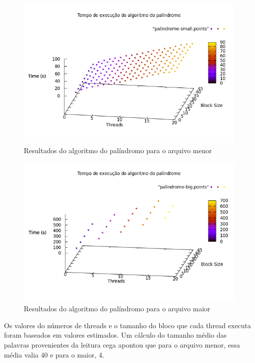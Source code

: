 \documentclass[a4paper]{article}
\begin{document}
\begin{figure}[float=p]
	\includegraphics[scale=0.5]{graph-palindrome-small}
	\caption{Resultados do algoritmo do palíndromo para o arquivo menor}
	\label{graph-palindrome-small}
\end{figure}
\begin{figure}[float=p]
	\includegraphics[scale=0.5]{graph-palindrome-big}
	\caption{Resultados do algoritmo do palíndromo para o arquivo maior}
	\label{graph-palindrome-big}
\end{figure}
Os valores do números de threads e o tamanho do bloco que cada thread executa foram baseados em valores estimados. Um cálculo do tamanho médio das palavras provenientes da leitura cega apontou que para o arquivo menor, essa média valia 40 e para o maior, 4.
\end{document}
